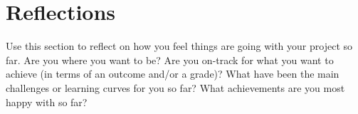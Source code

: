 \section{Reflections}
Use this section to reflect on how you feel things are going with your project so far. Are you where you want to be? Are you on-track for what you want to achieve (in terms of an outcome and/or a grade)? What have been the main challenges or learning curves for you so far? What achievements are you most happy with so far?